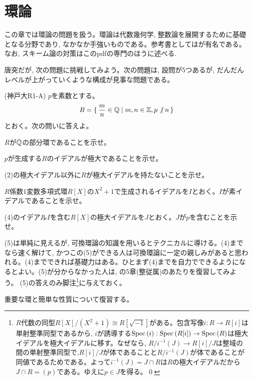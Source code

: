 \chapter{環論}
この章では環論の問題を扱う。環論は代数幾何学, 整数論を展開するために基礎となる分野であり, なかなか手強いものである。参考書としては\cite{atiyah}が有名である。なお, スキーム論の対策はこのpdfの専門のほうに述べる. \par
唐突だが, 次の問題に挑戦してみよう。次の問題は, 設問が5つあるが, だんだんレベルが上がっていくような構成が見事な問題である。
\begin{prac} (神戸大R1-A) \label{prac:kobeR1_A}
$p$を素数とする。
\[R = \set{\dfrac{m}{n}\in \mathbb{Q}\mid m,n\in \mathbb{Z}, p\not | n}\]
とおく。次の問いに答えよ。
\ben
\item $R$が$\mathbb{Q}$の部分環であることを示せ。
\item $p$が生成する$R$のイデアルが極大であることを示せ。
\item (2)の極大イデアル以外に$R$が極大イデアルを持たないことを示せ。
\item $R$係数$1$変数多項式環$R[X]$の$X^2+1$で生成されるイデアルを$I$とおく。$I$が素イデアルであることを示せ。
\item (4)のイデアル$I$を含む$R[X]$の極大イデアルを$J$とおく。$J$が$p$を含むことを示せ。
\een
\end{prac}
(5)は単純に見えるが, 可換環論の知識を用いるとテクニカルに導ける。(4)までなら速く解けて, かつこの(5)ができる人は可換環論に一定の親しみがあると思われる。(4)までできれば基礎力はある。ひとまず(4)までを自力でできるようになるとよい。(5)が分からなかった人は, \cite{atiyah}の5章(整従属)のあたりを復習してみよう。
(5)の答えのみ脚注\footnote{
$R$代数の同型$R[X]/(X^2+1)\cong R[\sqrt{-1}]$がある。包含写像$i:R\to R[i]$は単射整準同型であるから, $i$が誘導する$\mathrm{Spec}\left( i \right): \mathrm{Spec}\left( R[i] \right)\to \mathrm{Spec}\left( R \right)$は極大イデアルを極大イデアルに移す。なぜなら, $R/i^{-1}(J)\to R[i]/J$は整域の間の単射整準同型で,$R[i]/J$が体であることと$R/i^{-1}(J)$が体であることが同値であるためである。よって$i^{-1}(J) = J\cap R$は$R$の極大イデアルだから$J\cap R = (p)$である。ゆえに$p\in J$を得る。\qed

}に与えておく。\par





重要な環と簡単な性質について復習する。
